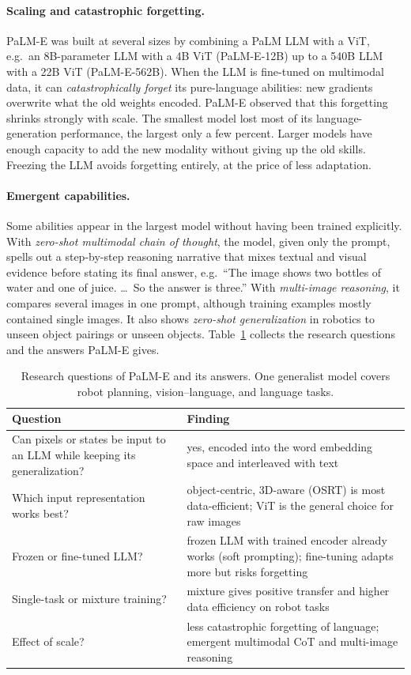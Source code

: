 \paragraph{Scaling and catastrophic forgetting.}
PaLM-E was built at several sizes by combining a PaLM LLM with a ViT, e.g.\
an 8B-parameter LLM with a 4B ViT (PaLM-E-12B) up to a 540B LLM with a 22B
ViT (PaLM-E-562B). When the LLM is fine-tuned on multimodal data, it can
\emph{catastrophically forget} its pure-language abilities: new gradients
overwrite what the old weights encoded. PaLM-E observed that this forgetting
shrinks strongly with scale. The smallest model lost most of its
language-generation performance, the largest only a few percent. Larger
models have enough capacity to add the new modality without giving up the
old skills. Freezing the LLM avoids forgetting entirely, at the price of less
adaptation.

\paragraph{Emergent capabilities.}
Some abilities appear in the largest model without having been trained
explicitly. With \emph{zero-shot multimodal chain of thought}, the model,
given only the prompt, spells out a step-by-step reasoning narrative that
mixes textual and visual evidence before stating its final answer, e.g.\
``The image shows two bottles of water and one of juice. \dots\ So the answer
is three.'' With \emph{multi-image reasoning}, it compares several images in
one prompt, although training examples mostly contained single images. It
also shows \emph{zero-shot generalization} in robotics to unseen object
pairings or unseen objects. Table~\ref{tab:palme-summary} collects the
research questions and the answers PaLM-E gives.

\begin{table}[ht]
  \centering
  \begin{tabular}{@{}p{5.6cm}p{8.2cm}@{}}
    \toprule
    Question & Finding \\
    \midrule
    Can pixels or states be input to an LLM while keeping its
      generalization? & yes, encoded into the word embedding space and
      interleaved with text \\
    Which input representation works best? & object-centric, 3D-aware (OSRT)
      is most data-efficient; ViT is the general choice for raw images \\
    Frozen or fine-tuned LLM? & frozen LLM with trained encoder already works
      (soft prompting); fine-tuning adapts more but risks forgetting \\
    Single-task or mixture training? & mixture gives positive transfer and
      higher data efficiency on robot tasks \\
    Effect of scale? & less catastrophic forgetting of language; emergent
      multimodal CoT and multi-image reasoning \\
    \bottomrule
  \end{tabular}
  \caption{Research questions of PaLM-E and its answers. One generalist
  model covers robot planning, vision--language, and language tasks.}
  \label{tab:palme-summary}
\end{table}

